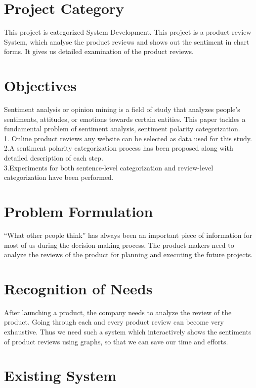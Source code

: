 \section{Project Category}
This project is categorized System Development. This project is a product review System, which analyse the product reviews and shows out the sentiment in chart forms. It gives us detailed examination of the product reviews.

\section{Objectives} 

Sentiment analysis or opinion mining is a field of study that analyzes people’s sentiments, attitudes, or emotions towards certain entities. This paper tackles a fundamental problem of sentiment analysis, sentiment polarity categorization. \\
1. Online product reviews any website can be selected as data used for this study.\\
2.A sentiment polarity categorization process  has been proposed along with detailed description of each step.\\
3.Experiments for both sentence-level categorization and review-level categorization have been performed.\\

\section{Problem Formulation}
“What other people think” has always been an important piece of information for most of us during the decision-making process. The product makers need to analyze the reviews of the product for planning and executing the future projects.

\section{Recognition of Needs}
After launching a product, the company needs to analyze the review of the product. Going through each and every product review can become very exhaustive. Thus we need such a system which interactively shows the sentiments of product reviews using graphs, so that we can save our time and efforts.

\section{Existing System}

